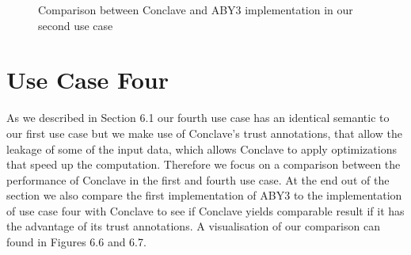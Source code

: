 \begin{figure}[H]
	\caption{Comparison between Conclave and ABY3 implementation in our second use case}
\end{figure}



\section{Use Case Four}
As we described in Section 6.1 our fourth use case has an identical semantic to our first use case but we make use of Conclave's trust annotations, that allow the leakage of some of the input data, which allows Conclave to apply optimizations that speed up the computation. Therefore we focus on a comparison between the performance of Conclave in the first and fourth use case. At the end out of the section we also compare the first implementation of ABY3 to the implementation of use case four with Conclave to see if Conclave yields comparable result if it has the advantage of its trust annotations.
 A visualisation of our comparison can found in Figures 6.6 and 6.7. 
